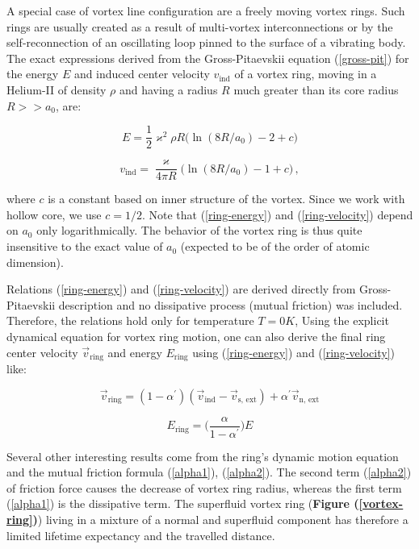 A special case of vortex line configuration are a freely moving vortex rings. Such rings are usually created as a result of multi-vortex interconnections \cite{vortex_ring} or by the self-reconnection of an oscillating loop pinned to the surface of a vibrating body. The exact expressions derived from the Gross-Pitaevskii equation (\ref{gross-pit}) \cite{roberts} for the energy $E$ and induced center velocity $v_{\text{ind}}$ of a vortex ring, moving in a Helium-II of density $\rho$ and having a radius $R$ much greater than its core radius $R >> a_0$, are:

\begin{equation}
E = \frac{1}{2}\varkappa^2 \rho R \Big(\ln(8R/a_0) - 2 + c\Big)
\label{ring-energy}
\end{equation}

\begin{equation}
v_{\text{ind}} = \frac{\varkappa}{4\pi R} \Big(\ln(8R/a_0) - 1 + c\Big)\,,
\label{ring-velocity}
\end{equation}

where $c$ is a constant based on inner structure of the vortex. Since we work with hollow core, we use \cite{donnelly_book}
$c = 1/2$. Note that (\ref{ring-energy}) and (\ref{ring-velocity}) depend on $a_0$ only logarithmically.
The behavior of the vortex ring is thus quite insensitive to the exact value of $a_0$ (expected to be of the order of atomic dimension).

Relations (\ref{ring-energy}) and (\ref{ring-velocity}) are derived directly from Gross-Pitaevskii description and no dissipative process (mutual friction) was included. Therefore, the relations hold only for temperature $T=0\unit{K}$, Using the explicit dynamical equation \cite{donnelly_book} for vortex ring motion, one can also derive the final ring center velocity $\vec{v}_{\text{ring}}$ and energy $E_{\text{ring}}$ using (\ref{ring-energy}) and (\ref{ring-velocity}) like:

\begin{equation}
\vec{v}_{\text{ring}} = (1 - \alpha^{\prime}) (\vec{v}_{\text{ind}} - \vec{v}_{\text{s, ext}})
+ \alpha^{\prime} \vec{v}_{\text{n, ext}}
\label{v_ring}
\end{equation}

\begin{equation}
E_{\text{ring}} = \Big( \frac{\alpha}{1 - \alpha^{\prime}} \Big) E
\label{E_ring}
\end{equation}

Several other interesting results come from the ring's dynamic motion equation and the mutual friction formula (\ref{alpha1}), (\ref{alpha2}). The second term (\ref{alpha2}) of friction force causes the decrease of vortex ring radius, whereas the first term (\ref{alpha1}) is the dissipative term. The superfluid vortex ring (\textbf{Figure (\ref{vortex-ring})}) living in a mixture of a normal and superfluid component has therefore a limited lifetime expectancy and the travelled distance.

